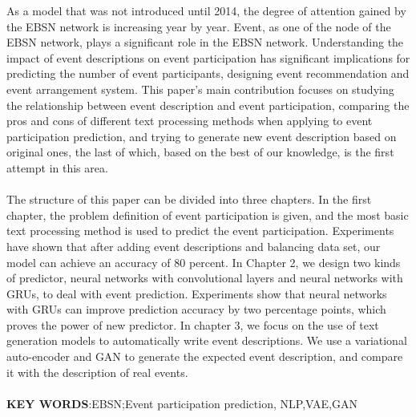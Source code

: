 \begin{myparindent}{0pt}
As a model that was not introduced until 2014, the degree of attention gained by the EBSN network is increasing year by year. Event, as one of the node of the EBSN network, plays a significant role in the EBSN network. Understanding the impact of event descriptions on event participation has significant implications for predicting the number of event participants, designing event recommendation and event arrangement system. This paper's main contribution focuses on studying the relationship between event description and event participation, comparing the pros and cons of different text processing methods when applying to event participation prediction, and trying to generate new event description based on original ones, the last of which, based on the best of our knowledge, is the first attempt in this area.
\\
\\
The structure of this paper can be divided into three chapters. In the first chapter, the problem definition of event participation is given, and the most basic text processing method is used to predict the event participation. Experiments have shown that after adding event descriptions and balancing data set, our model can achieve an accuracy of 80 percent. In Chapter 2, we design two kinds of predictor, neural networks with convolutional layers and neural networks with GRUs, to deal with event prediction. Experiments show that neural networks with GRUs can improve prediction accuracy by two percentage points, which proves the power of new predictor. In chapter 3, we focus on the use of text generation models to automatically write event descriptions. We use a variational auto-encoder and GAN to generate the expected event description, and compare it with the description of real events.
\\
\\
\textbf{KEY WORDS}:EBSN;Event participation prediction, NLP,VAE,GAN 
\end{myparindent}
% 